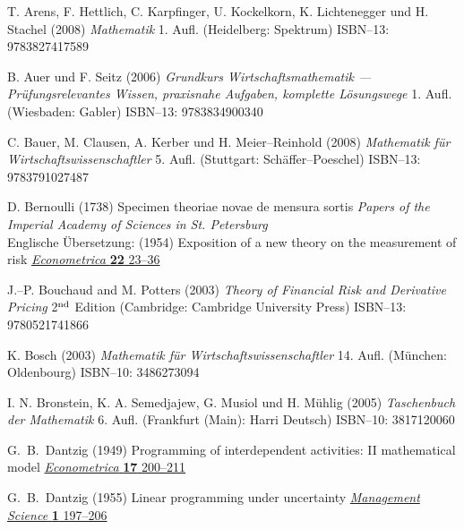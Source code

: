 \begin{thebibliography}{99}

T. Arens, F. Hettlich, C. Karpfinger, U. Kockelkorn,
K. Lichtenegger und H. Stachel
(2008) \emph{Mathematik}
1. Aufl. (Heidelberg: Spektrum) ISBN--13: 9783827417589

B. Auer und F. Seitz
(2006) \emph{Grundkurs Wirtschaftsmathematik --- 
Pr\"ufungsrelevantes Wissen, praxisnahe Aufgaben, komplette 
L\"osungswege} 1. Aufl. (Wiesbaden: Gabler) ISBN--13: 9783834900340

C. Bauer, M. Clausen, A. Kerber und H. Meier--Reinhold
(2008) \emph{Mathematik f\"ur Wirtschaftswissenschaftler}
5. Aufl. (Stuttgart: Sch\"affer--Poeschel) ISBN--13: 9783791027487

D. Bernoulli
(1738) Specimen theoriae novae de mensura sortis
\emph{Papers of the Imperial Academy of Sciences in St. 
Petersburg}\\
Englische \"Ubersetzung: (1954) Exposition of a new theory on the 
measurement of risk
\href{http://www.jstor.org/stable/1909829}{\emph{Econometrica} 
{\bf 22} 23--36}

J.--P. Bouchaud and M. Potters
(2003) \emph{Theory of Financial Risk and Derivative Pricing}
2$^{\rm nd}$ Edition (Cambridge: Cambridge University Press)
ISBN--13: 9780521741866

K. Bosch
(2003) \emph{Mathematik f\"ur Wirtschaftswissenschaftler}
14. Aufl. (M\"unchen: Oldenbourg) ISBN--10: 3486273094

I. N. Bronstein, K. A. Semedjajew, G. Musiol und H. M\"uhlig
(2005) \emph{Taschenbuch der Mathematik}
6. Aufl. (Frankfurt (Main): Harri Deutsch) ISBN--10: 3817120060

G.~B.~Dantzig
(1949) Programming of interdependent activities: II mathematical 
model
\href{http://dx.doi.org/10.2307/1905523}{\emph{Econometrica} {\bf 
17} 200--211}

G.~B.~Dantzig
(1955) Linear programming under uncertainty
\href{http://dx.doi.org/10.1287/mnsc.1.3-4.197}{\emph{Management 
Science} {\bf 1} 197--206}


\end{thebibliography}
